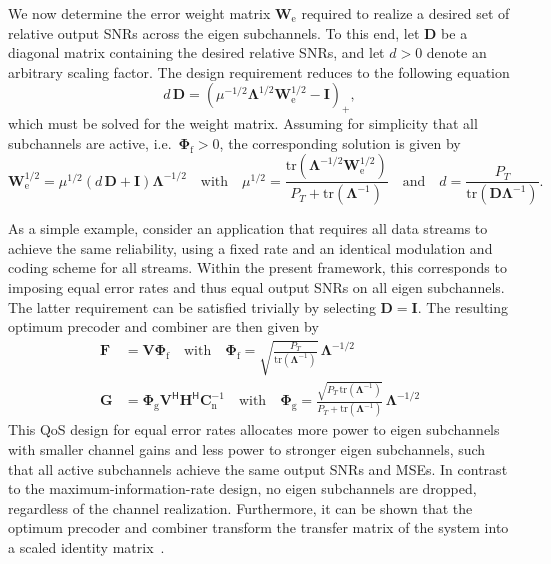 We now determine the error weight matrix $\mathbf{W}_{\mathrm{e}}$ required to realize a desired set of relative output \acp{SNR} across the eigen subchannels.
To this end, let $\mathbf{D}$ be a diagonal matrix containing the desired relative \acp{SNR}, and let $d > 0$ denote an arbitrary scaling factor.
The design requirement reduces to the following equation
\begin{equation}
\label{eq:QoS_weight_matrix_equation}
    d \, \mathbf{D} = (\mu^{-1/2} \mathbf{\Lambda}^{1/2} \mathbf{W}^{1/2}_{\mathrm{e}} - \mathbf{I})_{+},
\end{equation}
which must be solved for the weight matrix.
Assuming for simplicity that all subchannels are active, i.e.\ $\mathbf{\Phi}_{\mathrm{f}} > 0$, the corresponding solution is given by~\cite{su_mimo_joint_precoder_decoder_design}
\begin{equation}
\label{eq:QoS_weight_matrix_solution}
    \mathbf{W}^{1/2}_{\mathrm{e}} = \mu^{1/2} (d \, \mathbf{D} + \mathbf{I}) \mathbf{\Lambda}^{-1/2}
    \quad \text{with} \quad \mu^{1/2} = \frac{\mathrm{tr}(\mathbf{\Lambda}^{-1/2} \mathbf{W}^{1/2}_{\mathrm{e}})}{P_T + \mathrm{tr}(\mathbf{\Lambda}^{-1})}
    \quad \text{and} \quad d = \frac{P_T}{\mathrm{tr}(\mathbf{D} \mathbf{\Lambda}^{-1})}.
\end{equation}

As a simple example, consider an application that requires all data streams to achieve the same reliability, using a fixed rate and an identical modulation and coding scheme for all streams.
Within the present framework, this corresponds to imposing equal error rates and thus equal output \acp{SNR} on all eigen subchannels.
The latter requirement can be satisfied trivially by selecting $\mathbf{D} = \mathbf{I}$.
The resulting optimum precoder and combiner are then given by~\cite{su_mimo_joint_precoder_decoder_design}
\begin{subequations}
\label{eq:optimum_precoder_combiner_equal_errors}
\begin{align}
    \mathbf{F} &= \mathbf{V} \mathbf{\Phi}_{\mathrm{f}} 
    \quad \text{with} \quad \mathbf{\Phi}_{\mathrm{f}} = \sqrt{\frac{P_T}{\mathrm{tr}(\mathbf{\Lambda}^{-1})}} \, \mathbf{\Lambda}^{-1/2}  \\
    \mathbf{G} &= \mathbf{\Phi}_{\mathrm{g}} \mathbf{V}^{\mathsf{H}} \mathbf{H}^{\mathsf{H}} \mathbf{C}^{-1}_{\mathrm{n}} 
    \quad \text{with} \quad \mathbf{\Phi}_{\mathrm{g}} = \frac{\sqrt{P_T \, \mathrm{tr}(\mathbf{\Lambda}^{-1})}}{P_T + \mathrm{tr}(\mathbf{\Lambda}^{-1})} \, \mathbf{\Lambda}^{-1/2} 
\end{align}
\end{subequations}
This \ac{QoS} design for equal error rates allocates more power to eigen subchannels with smaller channel gains and less power to stronger eigen subchannels, such that all active subchannels achieve the same output \acp{SNR} and \acp{MSE}.
In contrast to the maximum-information-rate design, no eigen subchannels are dropped, regardless of the channel realization.
Furthermore, it can be shown that the optimum precoder and combiner transform the transfer matrix of the system into a scaled identity matrix~\cite{su_mimo_joint_precoder_decoder_design}.

